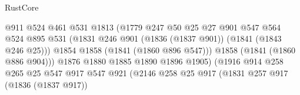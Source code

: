 \begin{lexlean}{RustCore}
\begin{coremodule}
                                              @911
                                              @524
                                              @461
                                              @531
                                              @1813
                                              (@1779
                                                @247
                                                @50
                                                @25
                                                @27
                                                @901
                                                @547
                                                @564
                                                @524
                                                @895
                                                @531
                                                (@1831
                                                  @246
                                                  @901
                                                  (@1836 (@1837 @901))
                                                  (@1841 (@1843 @246 @25)))
                                                @1854
                                                @1858
                                                (@1841 (@1860 @896 @547)))
                                              @1858
                                              (@1841 (@1860 @886 @904)))
                                            @1876
                                            @1880
                                            @1885
                                            @1890
                                            @1896
                                            @1905)
                                          (@1916
                                            @914
                                            @258
                                            @265
                                            @25
                                            @547
                                            @917
                                            @547
                                            @921
                                            (@2146
                                              @258
                                              @25
                                              @917
                                              (@1831
                                                @257
                                                @917
                                                (@1836 (@1837 @917))

\end{coremodule}
\end{lexlean}
